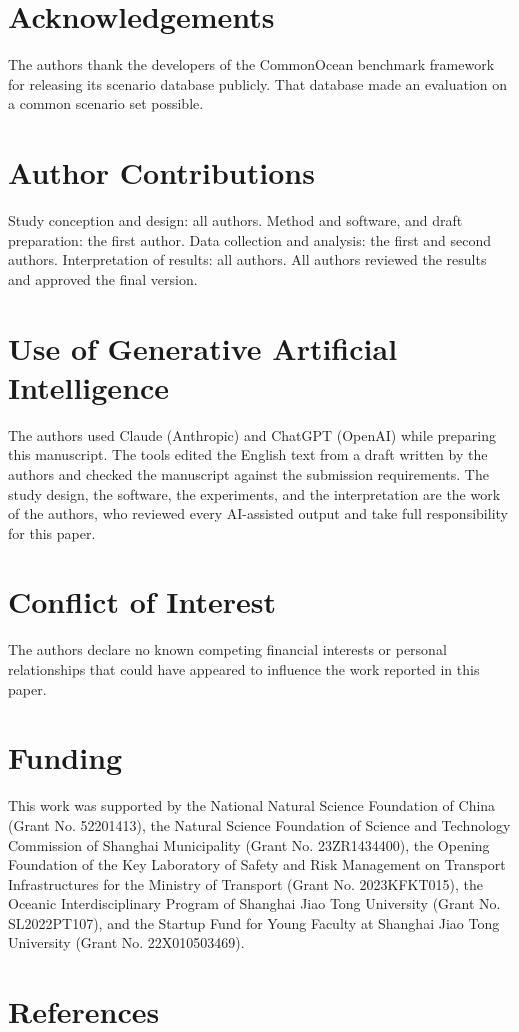 \documentclass[10pt,letterpaper]{article}
\begin{document}
\section*{Acknowledgements}

The authors thank the developers of the CommonOcean benchmark framework for releasing
its scenario database publicly. That database made an evaluation on a common scenario
set possible.

\section*{Author Contributions}

Study conception and design: all authors. Method and software, and draft preparation:
the first author. Data collection and analysis: the first and second authors.
Interpretation of results: all authors. All authors reviewed the results and approved
the final version.

\section*{Use of Generative Artificial Intelligence} The authors used Claude (Anthropic) and ChatGPT (OpenAI) while preparing this
manuscript. The tools edited the English text from a draft written by the authors and
checked the manuscript against the submission requirements. The study design, the software, the
experiments, and the interpretation are the work of the authors, who reviewed every
AI-assisted output and take full responsibility for this paper. \section*{Conflict of Interest}

The authors declare no known competing financial interests or personal relationships
that could have appeared to influence the work reported in this paper.

\section*{Funding}

This work was supported by the National Natural Science Foundation of China (Grant No. 52201413), the Natural Science Foundation of Science and Technology Commission of Shanghai Municipality (Grant No. 23ZR1434400), the Opening Foundation of the Key Laboratory of Safety and Risk Management on Transport Infrastructures for the Ministry of Transport (Grant No. 2023KFKT015), the Oceanic Interdisciplinary Program of Shanghai Jiao Tong University (Grant No. SL2022PT107), and the Startup Fund for Young Faculty at Shanghai Jiao Tong University (Grant No. 22X010503469).

\FloatBarrier   %
\section*{References}


\end{document}
